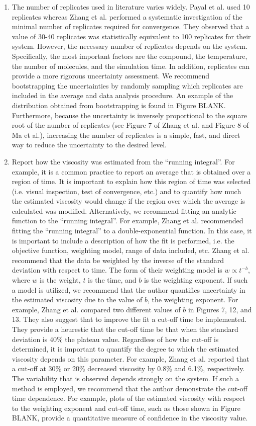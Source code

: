 \documentclass[9pt]{livecoms}
\begin{document}
\begin{enumerate}
	\item The number of replicates used in literature varies widely. Payal et al. used 10 replicates whereas Zhang et al. performed a systematic investigation of the minimal number of replicates required for convergence. They observed that a value of 30-40 replicates was statistically equivalent to 100 replicates for their system. However, the necessary number of replicates depends on the system. Specifically, the most important factors are the compound, the temperature, the number of molecules, and the simulation time.  In addition, replicates can provide a more rigorous uncertainty assessment. We recommend bootstrapping the uncertainties by randomly sampling which replicates are included in the average and data analysis procedure. An example of the distribution obtained from bootstrapping is found in Figure BLANK. Furthermore, because the uncertainty is inversely proportional to the square root of the number of replicates (see Figure 7 of Zhang et al. and Figure 8 of Ma et al.), increasing the number of replicates is a simple, fast, and direct way to reduce the uncertainty to the desired level.
	\item Report how the viscosity was estimated from the ``running integral''. For example, it is a common practice to report an average that is obtained over a region of time. It is important to explain how this region of time was selected (i.e. visual inspection, test of convergence, etc.) and to quantify how much the estimated viscosity would change if the region over which the average is calculated was modified. Alternatively, we recommend fitting an analytic function to the ``running integral''. For example, Zhang et al. recommended fitting the ``running integral'' to a double-exponential function. In this case, it is important to include a description of how the fit is performed, i.e. the objective function, weighting model, range of data included, etc. Zhang et al. recommend that the data be weighted by the inverse of the standard deviation with respect to time. The form of their weighting model is $w \propto t^{-b}$, where $w$ is the weight, $t$ is the time, and $b$ is the weighting exponent. If such a model is utilized, we recommend that the author quantifies uncertainty in the estimated viscosity due to the value of $b$, the weighting exponent. For example, Zhang et al. compared two different values of $b$ in Figures 7, 12, and 13. They also suggest that to improve the fit a cut-off time be implemented. They provide a heurestic that the cut-off time be that when the standard deviation is 40\% the plateau value. Regardless of how the cut-off is determined, it is important to quantify the degree to which the estimated viscosity depends on this parameter. For example, Zhang et al. reported that a cut-off at 30\% or 20\% decreased viscosity by 0.8\% and 6.1\%, respectively. The variability that is observed depends strongly on the system. If such a method is employed, we recommend that the author demonstrate the cut-off time dependence. For example, plots of the estimated viscosity with respect to the weighting exponent and cut-off time, such as those shown in Figure BLANK, provide a quantitative measure of confidence in the viscosity value.  

\end{enumerate}
\end{document}
